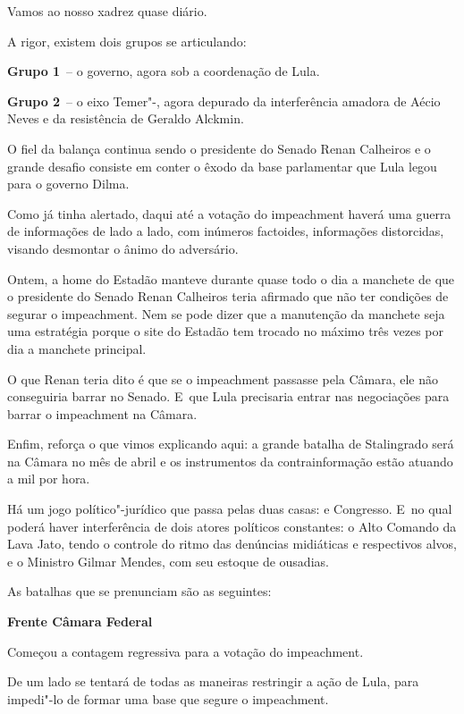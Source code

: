  

Vamos ao nosso xadrez quase diário.

A rigor, existem dois grupos se articulando:

\textbf{Grupo 1}~-- o governo, agora sob a coordenação de Lula.

\textbf{Grupo 2}~-- o eixo Temer"-, agora depurado da interferência
amadora de Aécio Neves e da resistência de Geraldo Alckmin.

O fiel da balança continua sendo o presidente do Senado Renan Calheiros
e o grande desafio consiste em conter o êxodo da base parlamentar que
Lula legou para o governo Dilma.

Como já tinha alertado, daqui até a votação do impeachment haverá uma
guerra de informações de lado a lado, com inúmeros factoides,
informações distorcidas, visando desmontar o ânimo do adversário.

Ontem, a home do Estadão manteve durante quase todo o dia a manchete de
que o presidente do Senado Renan Calheiros teria afirmado que não ter
condições de segurar o impeachment. Nem se pode dizer que a manutenção
da manchete seja uma estratégia porque o site do Estadão tem trocado no
máximo três vezes por dia a manchete principal.

O que Renan teria dito é que se o impeachment passasse pela Câmara, ele
não conseguiria barrar no Senado. E~que Lula precisaria entrar nas
negociações para barrar o impeachment na Câmara.

Enfim, reforça o que vimos explicando aqui: a grande batalha de
Stalingrado será na Câmara no mês de abril e os instrumentos da
contrainformação estão atuando a mil por hora.

Há um jogo político"-jurídico que passa pelas duas casas:  e
Congresso. E~no qual poderá haver interferência de dois atores políticos
constantes: o Alto Comando da Lava Jato, tendo o controle do ritmo das
denúncias midiáticas e respectivos alvos, e o Ministro Gilmar Mendes,
com seu estoque de ousadias.

As batalhas que se prenunciam são as seguintes:

\textbf{Frente Câmara Federal}

Começou a contagem regressiva para a votação do impeachment.

De um lado se tentará de todas as maneiras restringir a ação de Lula,
para impedi"-lo de formar uma base que segure o impeachment.

